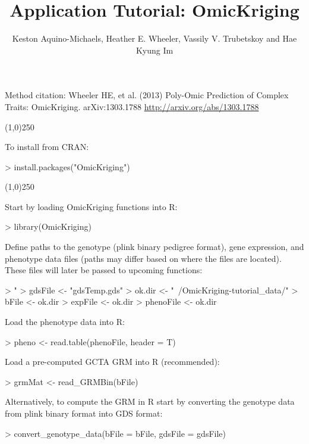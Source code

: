 \documentclass[a4paper]{article}
\title{Application Tutorial: OmicKriging}
\author{Keston Aquino-Michaels, Heather E. Wheeler, Vassily V. Trubetskoy and Hae Kyung Im}
\begin{document}
\maketitle
Method citation: Wheeler HE, et al. (2013) Poly-Omic Prediction of Complex Traits: OmicKriging. arXiv:1303.1788 \url{http://arxiv.org/abs/1303.1788}
\begin{center}
\line(1,0){250}
\end{center}
To install from CRAN:
\begin{Schunk}
\begin{Sinput}
> install.packages("OmicKriging")
\end{Sinput}
\end{Schunk}
\begin{center}
\line(1,0){250}
\end{center}
Start by loading OmicKriging functions into R:
\begin{Schunk}
\begin{Sinput}
> library(OmicKriging)
\end{Sinput}
\end{Schunk}
Define paths to the genotype (plink binary pedigree format), gene expression, and phenotype data files (paths may differ based on where the files are located). These files will later be passed to upcoming functions:
\begin{Schunk}
\begin{Sinput}
> "%&%" <- function(a, b) paste(a, b, sep="")
> gdsFile <- "gdsTemp.gds"
> ok.dir <- "~/OmicKriging-tutorial_data/"
> bFile <- ok.dir %&% "ig_genotypes"
> expFile <- ok.dir %&% "ig_gene_exon.txt"
> phenoFile <- ok.dir %&% "ig_pheno.txt"
\end{Sinput}
\end{Schunk}
Load the phenotype data into R:
\begin{Schunk}
\begin{Sinput}
> pheno <- read.table(phenoFile, header = T)
\end{Sinput}
\end{Schunk}
Load a pre-computed GCTA GRM into R (recommended):
\begin{Schunk}
\begin{Sinput}
> grmMat <- read_GRMBin(bFile)
\end{Sinput}
\end{Schunk}
Alternatively, to compute the GRM in R start by converting the genotype data from plink binary format into GDS format:
\begin{Schunk}
\begin{Sinput}
> convert_genotype_data(bFile = bFile, gdsFile = gdsFile)
\end{Sinput}
\end{Schunk}
\end{document}
